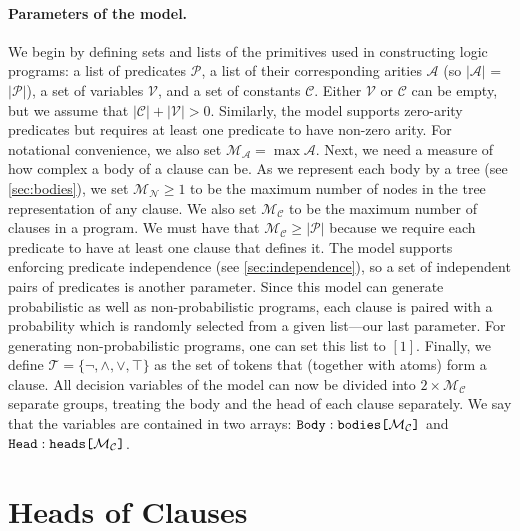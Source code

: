 \documentclass[runningheads]{llncs}
\newcommand{\variable}[1]{\texttt{\textup{#1}}}
\newcommand{\arrayt}[3]{\variable{{#3}} : \variable{{#1}[}{#2}\variable{]}}
\newcommand{\predicates}{\mathcal{P}}
\newcommand{\variables}{\mathcal{V}}
\newcommand{\constants}{\mathcal{C}}
\newcommand{\tokens}{\mathcal{T}}
\newcommand{\arities}{\mathcal{A}}
\newcommand{\maxArity}{\mathcal{M}_{\mathcal{A}}}
\newcommand{\maxNumNodes}{\mathcal{M}_{\mathcal{N}}}
\newcommand{\maxNumClauses}{\mathcal{M}_{\mathcal{C}}}
\begin{document}
\paragraph{Parameters of the model.} We begin by defining sets and lists of the
primitives used in constructing logic programs: a list of predicates
$\predicates{}$, a list of their corresponding arities $\arities{}$ (so
$|\arities{}|$ = $|\predicates{}|$), a set of variables $\variables{}$, and a
set of constants $\constants{}$. Either $\variables{}$ or $\constants{}$ can be
empty, but we assume that $|\constants{}| + |\variables{}| > 0$. Similarly, the
model supports zero-arity predicates but requires at least one predicate to have
non-zero arity. For notational convenience, we also set $\maxArity{} = \max
\arities{}$. Next, we need a measure of how complex a body of a clause can be.
As we represent each body by a tree (see \cref{sec:bodies}), we set
$\maxNumNodes{} \ge 1$ to be the maximum number of nodes in the tree
representation of any clause. We also set $\maxNumClauses{}$ to be the maximum
number of clauses in a program. We must have that $\maxNumClauses{} \ge
|\predicates{}|$ because we require each predicate to have at least one clause
that defines it. The model supports enforcing predicate independence (see
\cref{sec:independence}), so a set of independent pairs of predicates is another
parameter. Since this model can generate probabilistic as well as
non-probabilistic programs, each clause is paired with a probability which is
randomly selected from a given list---our last parameter. For generating
non-probabilistic programs, one can set this list to $[1]$. Finally, we define
$\tokens{} = \{ \neg, \land, \lor, \top \}$ as the set of tokens that (together
with atoms) form a clause. All decision variables of the model can now be
divided into $2 \times \maxNumClauses{}$ separate groups, treating the body and
the head of each clause separately. We say that the variables are contained in
two arrays: $\arrayt{bodies}{\maxNumClauses{}}{Body}$ and
$\arrayt{heads}{\maxNumClauses{}}{Head}$.

\section{Heads of Clauses} \label{sec:heads}
\end{document}
